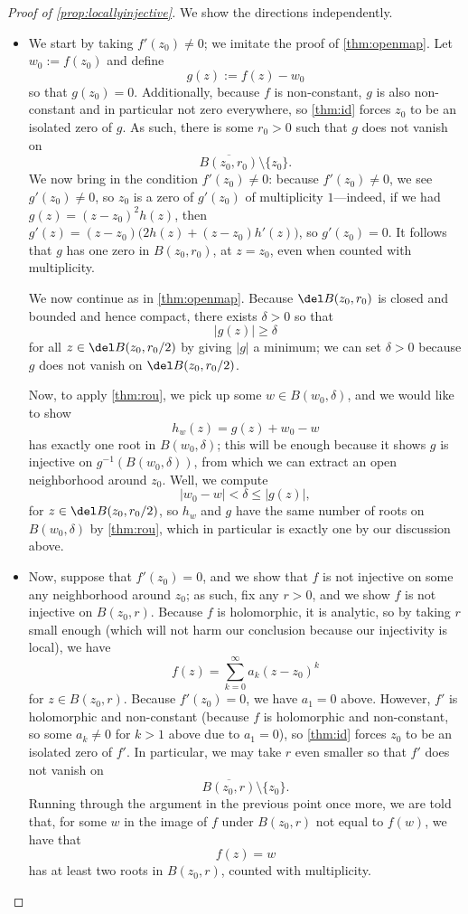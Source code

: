 \begin{proof}[Proof of \autoref{prop:locallyinjective}]
	We show the directions independently.
	\begin{itemize}
		\item We start by taking $f'(z_0)\ne0$; we imitate the proof of \autoref{thm:openmap}. Let $w_0:=f(z_0)$ and define
		\[g(z):=f(z)-w_0\]
		so that $g(z_0)=0$. Additionally, because $f$ is non-constant, $g$ is also non-constant and in particular not zero everywhere, so \autoref{thm:id} forces $z_0$ to be an isolated zero of $g$. As such, there is some $r_0>0$ such that $g$ does not vanish on
		\[\overline{B(z_0,r_0)}\setminus\{z_0\}.\]
		We now bring in the condition $f'(z_0)\ne0$: because $f'(z_0)\ne0$, we see $g'(z_0)\ne0$, so $z_0$ is a zero of $g'(z_0)$ of multiplicity $1$---indeed, if we had $g(z)=(z-z_0)^2h(z)$, then $g'(z)=(z-z_0)\big(2h(z)+(z-z_0)h'(z)\big)$, so $g'(z_0)=0$. It follows that $g$ has one zero in $B(z_0,r_0)$, at $z=z_0$, even when counted with multiplicity.
	
		We now continue as in \autoref{thm:openmap}. Because $\del B(z_0,r_0)$ is closed and bounded and hence compact, there exists $\delta>0$ so that
		\[|g(z)|\ge\delta\]
		for all $z\in\del B(z_0,r_0/2)$ by giving $|g|$ a minimum; we can set $\delta>0$ because $g$ does not vanish on $\del B(z_0,r_0/2)$.
	
		Now, to apply \autoref{thm:rou}, we pick up some $w\in B(w_0,\delta)$, and we would like to show 
		\[h_w(z)=g(z)+w_0-w\]
		has exactly one root in $B(w_0,\delta)$; this will be enough because it shows $g$ is injective on $g^{-1}(B(w_0,\delta))$, from which we can extract an open neighborhood around $z_0$. Well, we compute
		\[|w_0-w|<\delta\le|g(z)|,\]
		for $z\in\del B(z_0,r_0/2)$, so $h_w$ and $g$ have the same number of roots on $B(w_0,\delta)$ by \autoref{thm:rou}, which in particular is exactly one by our discussion above.
	
		\item Now, suppose that $f'(z_0)=0$, and we show that $f$ is not injective on some any neighborhood around $z_0$; as such, fix any $r>0$, and we show $f$ is not injective on $B(z_0,r)$. Because $f$ is holomorphic, it is analytic, so by taking $r$ small enough (which will not harm our conclusion because our injectivity is local), we have
		\[f(z)=\sum_{k=0}^\infty a_k(z-z_0)^k\]
		for $z\in B(z_0,r)$. Because $f'(z_0)=0$, we have $a_1=0$ above. However, $f'$ is holomorphic and non-constant (because $f$ is holomorphic and non-constant, so some $a_k\ne0$ for $k>1$ above due to $a_1=0$), so \autoref{thm:id} forces $z_0$ to be an isolated zero of $f'$. In particular, we may take $r$ even smaller so that $f'$ does not vanish on
		\[\overline{B(z_0,r)}\setminus\{z_0\}.\]
		Running through the argument in the previous point once more, we are told that, for some $w$ in the image of $f$ under $B(z_0,r)$ not equal to $f(w)$, we have that
		\[f(z)=w\]
		has at least two roots in $B(z_0,r)$, counted with multiplicity.


\end{itemize}
\end{proof}
